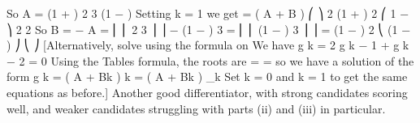 \documentclass[a4paper,12pt]{article}
\begin{document}
So A =
(1 +  )
2 3
(1 − \alpha )
Setting k = 1 we get  = ( A + B ) \alpha
⎛
⎞ 2 (1 +  ) 2 ⎛ 1 −  ⎞ 2
2 \alpha
So B = − A = ⎜ ⎜
2 3 ⎟
⎟ \sigma − (1 −  ) 3 \sigma = ⎜ ⎜ (1 −  ) 3 ⎟ ⎟ \sigma = (1 −  ) 2
\alpha
⎝ \alpha (1 − \alpha ) ⎠
⎝
⎠
[Alternatively, solve using the formula on %
We have g k = 2 \alpha g k − 1 +  g k − 2 = 0
Using the Tables formula, the roots are  =  = \alpha so we have a solution
of the form g k = ( A + Bk ) \lambda k = ( A + Bk ) \alpha_{k}
Set k = 0 and k = 1 to get the same equations as before.]
Another good differentiator, with strong candidates scoring well, and weaker candidates
struggling with parts (ii) and (iii) in particular.

\end{document}
